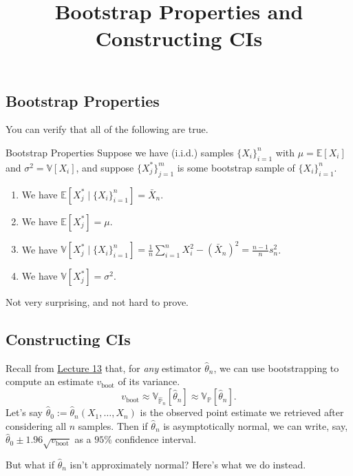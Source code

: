 \title{Bootstrap Properties and Constructing CIs}



\subsection{Bootstrap Properties}

You can verify that all of the following are true.

\begin{theorem}{Bootstrap Properties}
    Suppose we have (i.i.d.) samples $\{X_i\}_{i = 1}^n$
    with $\mu = \mathbb{E}[X_i]$ and $\sigma^2 = \mathbb{V}[X_i]$,
    and suppose $\{X_j^*\}_{j = 1}^m$ is some bootstrap sample of $\{X_i\}_{i = 1}^n$.
    \begin{enumerate}
        \item We have $\mathbb{E}[X_j^* \mid \{X_i\}_{i = 1}^n] = \bar{X}_n$.
        \item We have $\mathbb{E}[X_j^*] = \mu$.
        \item We have $\mathbb{V}[X_j^* \mid \{X_i\}_{i = 1}^n] =
        \frac{1}{n} \sum_{i = 1}^n X_i^2 - (\bar{X}_n)^2 = \frac{n - 1}{n} s_n^2$.
        \item We have $\mathbb{V}[X_j^*] = \sigma^2$.
    \end{enumerate}
\end{theorem}
Not very surprising, and not hard to prove.

\subsection{Constructing CIs}

Recall from \href{/18.650/lectures/13/#bootstrapping}{Lecture 13} that,
for \emph{any} estimator $\hat{\theta}_n$,
we can use bootstrapping to compute an estimate $v_{\mathrm{boot}}$ of its variance.
\[ v_{\mathrm{boot}} \approx \mathbb{V}_{\hat{\mathbb{P}}_n}[\hat{\theta}_n]
\approx \mathbb{V}_{\mathbb{P}}[\hat{\theta}_n]. \]
Let's say $\hat{\theta}_0 := \hat{\theta}_n(X_1, \dots, X_n)$
is the observed point estimate we retrieved after considering all $n$ samples.
Then if $\hat{\theta}_n$ is asymptotically normal,
we can write, say, $\hat{\theta}_0 \pm 1.96\sqrt{v_{\mathrm{boot}}}$
as a $95\%$ confidence interval.

But what if $\hat{\theta}_n$ isn't approximately normal?
Here's what we do instead.

